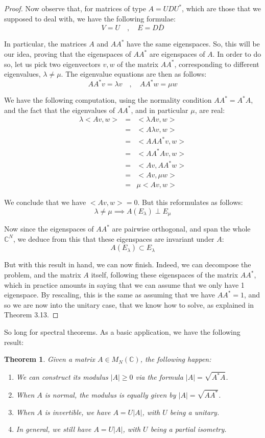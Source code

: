 \documentclass[12pt]{amsbook}
\newtheorem{theorem}{Theorem}[chapter]
\begin{document}
\begin{proof}
Now observe that, for matrices of type $A=UDU^*$, which are those that we supposed to deal with, we have the following formulae:
$$V=U\quad,\quad 
E=D\bar{D}$$

In particular, the matrices $A$ and $AA^*$ have the same eigenspaces. So, this will be our idea, proving that the eigenspaces of $AA^*$ are eigenspaces of $A$. In order to do so, let us pick two eigenvectors $v,w$ of the matrix $AA^*$, corresponding to different eigenvalues, $\lambda\neq\mu$. The eigenvalue equations are then as follows:
$$AA^*v=\lambda v\quad,\quad 
AA^*w=\mu w$$

We have the following computation, using the normality condition $AA^*=A^*A$, and the fact that the eigenvalues of $AA^*$, and in particular $\mu$, are real:
\begin{eqnarray*}
\lambda<Av,w>
&=&<\lambda Av,w>\\
&=&<A\lambda v,w>\\
&=&<AAA^*v,w>\\
&=&<AA^*Av,w>\\
&=&<Av,AA^*w>\\
&=&<Av,\mu w>\\
&=&\mu<Av,w>
\end{eqnarray*}

We conclude that we have $<Av,w>=0$. But this reformulates as follows:
$$\lambda\neq\mu\implies A(E_\lambda)\perp E_\mu$$

Now since the eigenspaces of $AA^*$ are pairwise orthogonal, and span the whole $\mathbb C^N$, we deduce from this that these eigenspaces are invariant under $A$:
$$A(E_\lambda)\subset E_\lambda$$

But with this result in hand, we can now finish. Indeed, we can decompose the problem, and the matrix $A$ itself, following these eigenspaces of the matrix $AA^*$, which in practice amounts in saying that we can assume that we only have 1 eigenspace. By rescaling, this is the same as assuming that we have $AA^*=1$, and so we are now into the unitary case, that we know how to solve, as explained in Theorem 3.13.
\end{proof}

So long for spectral theorems. As a basic application, we have the following result:


\begin{theorem}
Given a matrix $A\in M_N(\mathbb C)$, the following happen:
\begin{enumerate}
\item We can construct its modulus $|A|\geq0$ via the formula $|A|=\sqrt{A^*A}$.

\item When $A$ is normal, the modulus is equally given by $|A|=\sqrt{AA^*}$.

\item When $A$ is invertible, we have $A=U|A|$, with $U$ being a unitary.

\item In general, we still have $A=U|A|$, with $U$ being a partial isometry.
\end{enumerate}
\end{theorem}
\end{document}
